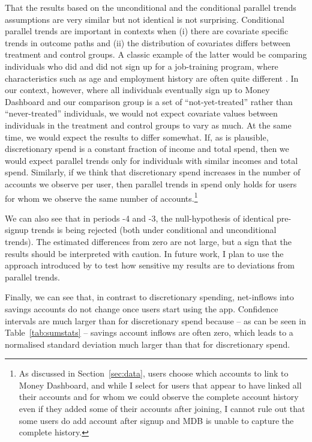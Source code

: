 That the results based on the unconditional and the conditional parallel trends
assumptions are very similar but not identical is not surprising. Conditional
parallel trends are important in contexts when (i) there are covariate specific
trends in outcome paths and (ii) the distribution of covariates differs between
treatment and control groups. A classic example of the latter would be
comparing individuals who did and did not sign up for a job-training program,
where characteristics such as age and employment history are often quite
different \citep{heckman1997matching}. In our context, however, where all
individuals eventually sign up to Money Dashboard and our comparison group is a
set of ``not-yet-treated'' rather than ``never-treated'' individuals, we would
not expect covariate values between individuals in the treatment and control
groups to vary as much. At the same time, we would expect the results to differ
somewhat. If, as is plausible, discretionary spend is a constant fraction of
income and total spend, then we would expect parallel trends only for
individuals with similar incomes and total spend. Similarly, if we think that
discretionary spend increases in the number of accounts we observe per user,
then parallel trends in spend only holds for users for whom we observe the same
number of accounts.\footnote{As discussed in Section~\ref{sec:data}, users
    choose which accounts to link to Money Dashboard, and while I select for
    users that appear to have linked all their accounts and for whom we could
    observe the complete account history even if they added some of their
accounts after joining, I cannot rule out that some users do add account after
signup and MDB is unable to capture the complete history.}

We can also see that in periods -4 and -3, the null-hypothesis of identical
pre-signup trends is being rejected (both under conditional and unconditional
trends). The estimated differences from zero are not large, but a sign that the
results should be interpreted with caution. In future work, I plan to use the
approach introduced by \citet{rambachan2022more} to test how sensitive my
results are to deviations from parallel trends.

Finally, we can see that, in contrast to discretionary spending, net-inflows
into savings accounts do not change once users start using the app. Confidence
intervals are much larger than for discretionary spend because -- as can be
seen in Table~\ref{tab:sumstats} -- savings account inflows are often zero,
which leads to a normalised standard deviation much larger than that for
discretionary spend.

